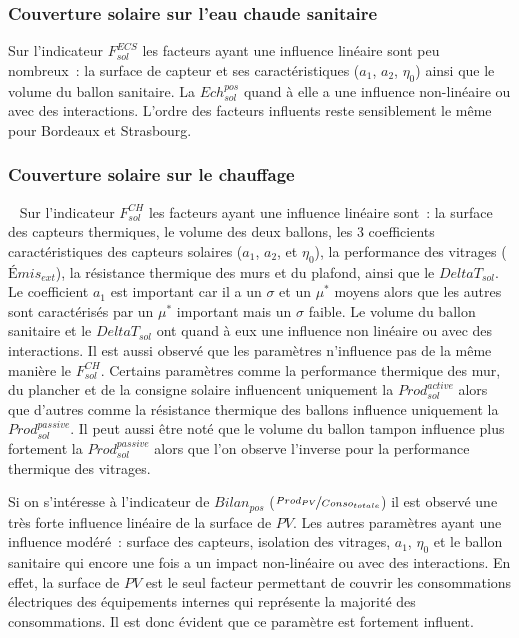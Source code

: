 \subsubsection{Couverture solaire sur l’eau chaude sanitaire} %
\label{ssub:couverture_solaire_sur_l_ECS}
Sur l’indicateur $F_{sol}^{ECS}$ les facteurs ayant une influence linéaire sont
peu nombreux~: la surface de capteur et ses caractéristiques ($a_{1}$, $a_{2}$, $\eta_{0}$)
ainsi que le volume du ballon sanitaire. La $Ech_{sol}^{pos}$ quand à elle a une influence
non-linéaire ou avec des interactions. L’ordre des facteurs influents reste sensiblement le
même pour Bordeaux et Strasbourg.


\subsubsection{Couverture solaire sur le chauffage} %
\label{ssub:couverture_solaire_sur_le_chauffage}
~
Sur l’indicateur $F_{sol}^{CH}$ les facteurs ayant une influence linéaire sont~: la
surface des capteurs thermiques, le volume des deux ballons, les \num{3} coefficients
caractéristiques des capteurs solaires ($a_{1}$, $a_{2}$, et $\eta_{0}$), la performance
des vitrages ($Émis_{ext}$), la résistance thermique des murs et du plafond, ainsi que le
$DeltaT_{sol}$. Le coefficient $a_{1}$ est important car il a un $\sigma$ et un $\mu^{*}$
moyens alors que les autres sont caractérisés par un $\mu^{*}$ important mais un $\sigma$
faible. Le volume du ballon sanitaire et le $DeltaT_{sol}$ ont quand à eux une influence
non linéaire ou avec des interactions.
Il est aussi observé que les paramètres n’influence pas de la même manière le $F_{sol}^{CH}$.
Certains paramètres comme la performance thermique des mur, du plancher et de la consigne solaire
influencent uniquement la $Prod_{sol}^{active}$ alors que
d’autres comme la résistance thermique des ballons influence uniquement la $Prod_{sol}^{passive}$.
Il peut aussi être noté que le volume du ballon tampon influence plus fortement la
$Prod_{sol}^{passive}$ alors que l’on observe l’inverse pour la performance thermique
des vitrages.


Si on s’intéresse à l’indicateur de $Bilan_{pos}$ ($\nicefrac{Prod_{PV}}{Conso_{totale}}$)
il est observé une très forte influence linéaire de la surface de $PV$. Les autres paramètres
ayant une influence modéré~: surface des capteurs, isolation des vitrages, $a_{1}$, $\eta_{0}$
et le ballon sanitaire qui encore une fois a un impact non-linéaire ou avec des interactions.
En effet, la surface de $PV$ est le seul facteur permettant de couvrir les consommations
électriques des équipements internes qui représente la majorité des consommations. Il est donc
évident que ce paramètre est fortement influent.


